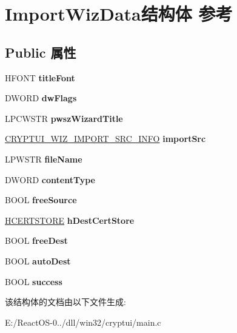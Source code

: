 \hypertarget{struct_import_wiz_data}{}\section{Import\+Wiz\+Data结构体 参考}
\label{struct_import_wiz_data}
\subsection*{Public 属性}
\begin{DoxyCompactItemize}
\item 
\mbox{\label{struct_import_wiz_data_a983dc2765f73f944ffc73dade8c1fd73}} 
H\+F\+O\+NT {\bfseries title\+Font}
\item 
\mbox{\label{struct_import_wiz_data_aa9560aaec4e418469fc7b5410c67a25f}} 
D\+W\+O\+RD {\bfseries dw\+Flags}
\item 
\mbox{\label{struct_import_wiz_data_af59d77cd7138c86396627885866f6729}} 
L\+P\+C\+W\+S\+TR {\bfseries pwsz\+Wizard\+Title}
\item 
\mbox{\label{struct_import_wiz_data_afac9fbe0ac12a032ef3800eb485f6237}} 
\hyperlink{struct___c_r_y_p_t_u_i___w_i_z___i_m_p_o_r_t___s_u_b_j_e_c_t___i_n_f_o}{C\+R\+Y\+P\+T\+U\+I\+\_\+\+W\+I\+Z\+\_\+\+I\+M\+P\+O\+R\+T\+\_\+\+S\+R\+C\+\_\+\+I\+N\+FO} {\bfseries import\+Src}
\item 
\mbox{\label{struct_import_wiz_data_a7411408218d206b05abcebf287f465c6}} 
L\+P\+W\+S\+TR {\bfseries file\+Name}
\item 
\mbox{\label{struct_import_wiz_data_af51ab360fd394ac67f15ed3791f7941e}} 
D\+W\+O\+RD {\bfseries content\+Type}
\item 
\mbox{\label{struct_import_wiz_data_aedf926c750759e107ed22c11eb04f007}} 
B\+O\+OL {\bfseries free\+Source}
\item 
\mbox{\label{struct_import_wiz_data_abf9f95f5a6f22aa7b73e2003141174c0}} 
\hyperlink{interfacevoid}{H\+C\+E\+R\+T\+S\+T\+O\+RE} {\bfseries h\+Dest\+Cert\+Store}
\item 
\mbox{\label{struct_import_wiz_data_a5bd049edff5a3d643d1377debc767438}} 
B\+O\+OL {\bfseries free\+Dest}
\item 
\mbox{\label{struct_import_wiz_data_ae9bac33032e2980c6ee840640d69fbe0}} 
B\+O\+OL {\bfseries auto\+Dest}
\item 
\mbox{\label{struct_import_wiz_data_aec9cd8f31c7a4cb944250fcc7444fb48}} 
B\+O\+OL {\bfseries success}
\end{DoxyCompactItemize}


该结构体的文档由以下文件生成\+:\begin{DoxyCompactItemize}
\item 
E\+:/\+React\+O\+S-\/0../dll/win32/cryptui/main.\+c\end{DoxyCompactItemize}
